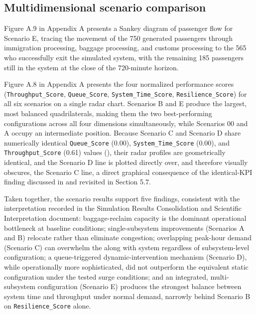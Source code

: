 \subsection{Multidimensional scenario comparison}
\label{subsec:multidimensional-scenario-comparison}

Figure A.9 in Appendix A presents a Sankey diagram of passenger flow for Scenario E, tracing the movement of the 750 generated passengers through immigration processing, baggage processing, and customs processing to the 565 who successfully exit the simulated system, with the remaining 185 passengers still in the system at the close of the 720-minute horizon.

Figure A.8 in Appendix A presents the four normalized performance scores (\nolinkurl{Throughput_Score}, \nolinkurl{Queue_Score}, \nolinkurl{System_Time_Score}, \nolinkurl{Resilience_Score}) for all six scenarios on a single radar chart. Scenarios B and E produce the largest, most balanced quadrilaterals, making them the two best-performing configurations across all four dimensions simultaneously, while Scenarios 00 and A occupy an intermediate position. Because Scenario C and Scenario D share numerically identical \nolinkurl{Queue_Score} (0.00), \nolinkurl{System_Time_Score} (0.00), and \nolinkurl{Throughput_Score} (0.61) values (), their radar profiles are geometrically identical, and the Scenario D line is plotted directly over, and therefore visually obscures, the Scenario C line, a direct graphical consequence of the identical-KPI finding discussed in  and revisited in Section 5.7.

Taken together, the scenario results support five findings, consistent with the interpretation recorded in the Simulation Results Consolidation and Scientific Interpretation document: baggage-reclaim capacity is the dominant operational bottleneck at baseline conditions; single-subsystem improvements (Scenarios A and B) relocate rather than eliminate congestion; overlapping peak-hour demand (Scenario C) can overwhelm the along with system regardless of subsystem-level configuration; a queue-triggered dynamic-intervention mechanism (Scenario D), while operationally more sophisticated, did not outperform the equivalent static configuration under the tested surge conditions; and an integrated, multi-subsystem configuration (Scenario E) produces the strongest balance between system time and throughput under normal demand, narrowly behind Scenario B on \nolinkurl{Resilience_Score} alone.

